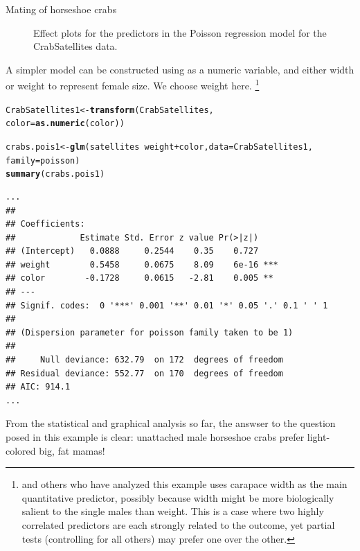 \documentclass[11pt]{book}\usepackage[]{graphicx}\usepackage[]{color}
\makeatletter
\newcommand{\hlopt}[1]{\textcolor[rgb]{0,0,0}{#1}}%
\newcommand{\hlstd}[1]{\textcolor[rgb]{0.345,0.345,0.345}{#1}}%
\newcommand{\hlkwb}[1]{\textcolor[rgb]{0.69,0.353,0.396}{#1}}%
\newcommand{\hlkwc}[1]{\textcolor[rgb]{0.333,0.667,0.333}{#1}}%
\newcommand{\hlkwd}[1]{\textcolor[rgb]{0.737,0.353,0.396}{\textbf{#1}}}%
\newenvironment{kframe}{%
 \def\at@end@of@kframe{}%
 \ifinner\ifhmode%
  \def\at@end@of@kframe{\end{minipage}}%
  \begin{minipage}{\columnwidth}%
 \fi\fi%
 \def\FrameCommand##1{\hskip\@totalleftmargin \hskip-\fboxsep
 \colorbox{shadecolor}{##1}\hskip-\fboxsep
     \hskip-\linewidth \hskip-\@totalleftmargin \hskip\columnwidth}%
 \MakeFramed {\advance\hsize-\width
   \@totalleftmargin\z@ \linewidth\hsize
   \@setminipage}}%
 {\par\unskip\endMakeFramed%
 \at@end@of@kframe}
\newenvironment{knitrout}{}{} %
\renewenvironment{knitrout}{\small\renewcommand{\baselinestretch}{.85}}{} %
\makeatother
\begin{document}
\begin{Example}[crabs1]{Mating of horseshoe crabs}
\begin{knitrout}
\begin{figure}[!htbp]
\caption[Effect plots for the predictors in the Poisson regression model for the CrabSatellites data]{Effect plots for the predictors in the Poisson regression model for the CrabSatellites data.\label{fig:crabs1-eff1}}
\end{figure}


\end{knitrout}

A simpler model can be constructed using  as a numeric variable, and either width or
weight to represent female size. We choose weight here.%
\footnote{
\citet[\S 4.3]{Agresti:2013} and others who have analyzed this example uses carapace width
as the main quantitative predictor, possibly because width might be more biologically salient
to the single males than weight.  This is a case where two 
highly correlated predictors are each strongly related to the outcome, 
yet partial tests (controlling for all others) may prefer one over the other.
}

\begin{knitrout}
\color{fgcolor}\begin{kframe}
\begin{alltt}
\hlstd{CrabSatellites1} \hlkwb{<-} \hlkwd{transform}\hlstd{(CrabSatellites,}
  \hlkwc{color} \hlstd{=} \hlkwd{as.numeric}\hlstd{(color))}

\hlstd{crabs.pois1} \hlkwb{<-} \hlkwd{glm}\hlstd{(satellites} \hlopt{~} \hlstd{weight} \hlopt{+} \hlstd{color,} \hlkwc{data}\hlstd{=CrabSatellites1,}
                   \hlkwc{family}\hlstd{=poisson)}
\hlkwd{summary}\hlstd{(crabs.pois1)}
\end{alltt}
\begin{verbatim}
...
## 
## Coefficients:
##             Estimate Std. Error z value Pr(>|z|)    
## (Intercept)   0.0888     0.2544    0.35    0.727    
## weight        0.5458     0.0675    8.09    6e-16 ***
## color        -0.1728     0.0615   -2.81    0.005 ** 
## ---
## Signif. codes:  0 '***' 0.001 '**' 0.01 '*' 0.05 '.' 0.1 ' ' 1
## 
## (Dispersion parameter for poisson family taken to be 1)
## 
##     Null deviance: 632.79  on 172  degrees of freedom
## Residual deviance: 552.77  on 170  degrees of freedom
## AIC: 914.1
...
\end{verbatim}
\end{kframe}
\end{knitrout}

From the statistical and graphical analysis so far, the answser to the question posed 
in this example is clear:  unattached male horseshoe crabs prefer light-colored
big, fat mamas!


\end{Example}
\end{document}

